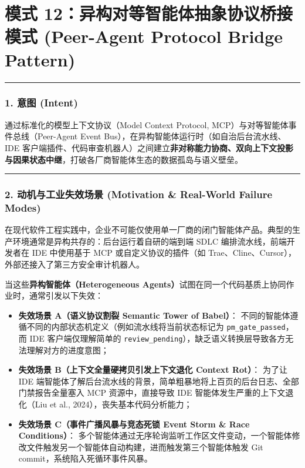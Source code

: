 \section{模式 12：异构对等智能体抽象协议桥接模式 (Peer-Agent Protocol
Bridge
Pattern)}\label{ux6a21ux5f0f-12ux5f02ux6784ux5bf9ux7b49ux667aux80fdux4f53ux62bdux8c61ux534fux8baeux6865ux63a5ux6a21ux5f0f-peer-agent-protocol-bridge-pattern}

\begin{center}\rule{0.5\linewidth}{0.5pt}\end{center}

\subsubsection{1. 意图 (Intent)}\label{ux610fux56fe-intent-11}

通过标准化的模型上下文协议（Model Context Protocol,
MCP）与对等智能体事件总线（Peer-Agent Event
Bus），在异构智能体运行时（如自治后台流水线、IDE
客户端插件、代码审查机器人）之间建立\textbf{非对称能力协商、双向上下文投影与因果状态中继}，打破各厂商智能体生态的数据孤岛与语义壁垒。

\begin{center}\rule{0.5\linewidth}{0.5pt}\end{center}

\subsubsection{2. 动机与工业失效场景 (Motivation \& Real-World Failure
Modes)}\label{ux52a8ux673aux4e0eux5de5ux4e1aux5931ux6548ux573aux666f-motivation-real-world-failure-modes-11}

在现代软件工程实践中，企业不可能仅使用单一厂商的闭门智能体产品。典型的生产环境通常是异构共存的：后台运行着自研的端到端
SDLC 编排流水线，前端开发者在 IDE 中使用基于 MCP 或自定义协议的插件（如
Trae、Cline、Cursor），外部还接入了第三方安全审计机器人。

当这些\textbf{异构智能体（Heterogeneous
Agents）}试图在同一个代码基质上协同作业时，通常引发以下失效：

\begin{itemize}
\tightlist
\item
  \textbf{失效场景 A（语义协议割裂 Semantic Tower of Babel）}：
  不同的智能体遵循不同的内部状态机定义（例如流水线将当前状态标记为
  \texttt{pm\_gate\_passed}，而 IDE 客户端仅理解简单的
  \texttt{review\_pending}），缺乏语义转换层导致各方无法理解对方的进度意图；
\item
  \textbf{失效场景 B（上下文全量硬拷贝引发上下文退化 Context Rot）}：
  为了让 IDE
  端智能体了解后台流水线的背景，简单粗暴地将上百页的后台日志、全部门禁报告全量塞入
  MCP 资源中，直接导致 IDE 智能体发生严重的上下文退化（Liu et al.,
  2024），丧失基本代码分析能力；
\item
  \textbf{失效场景 C（事件广播风暴与竞态死锁 Event Storm \& Race
  Conditions）}：
  多个智能体通过无序轮询监听工作区文件变动，一个智能体修改文件触发另一个智能体自动构建，进而触发第三个智能体触发
  Git commit，系统陷入死循环事件风暴。
\end{itemize}

